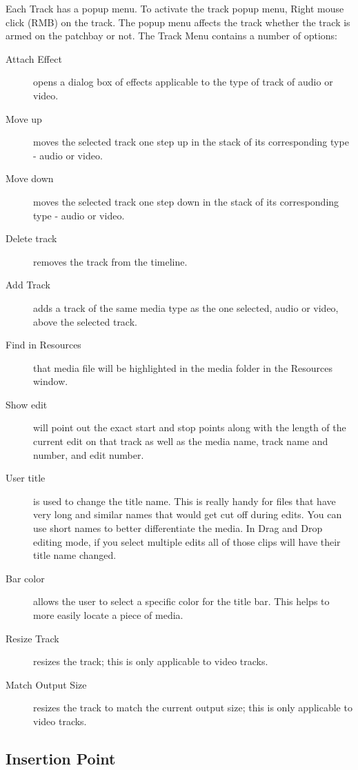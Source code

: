 Each Track has a popup menu. 
To activate the track popup menu, Right mouse click (RMB) on the track. 
The popup menu affects the track whether the track is armed on the patchbay or not. 
The Track Menu contains a number of options:

\begin{description}
    \item[Attach Effect] opens a dialog box of effects applicable to the type of track of audio or video.
    \item[Move up] moves the selected track one step up in the stack of its corresponding type - audio or video.
    \item[Move down]  moves the selected track one step down in the stack of its corresponding type - audio or video.
    \item[Delete track]  removes the track from the timeline.
    \item[Add Track]  adds a track of the same media type as the one selected, audio or video, above the selected track.
    \item[Find in Resources]  that media file will be highlighted in the media folder in the Resources window.
    \item[Show edit]  will point out the exact start and stop points along with the length of the current edit on
        that track as well as the media name, track name and number, and edit number.
    \item[User title]  is used to change the title name.  This is really handy for files that have very long and
        similar names that would get cut off during edits.  You can use short names to better differentiate the
        media. In Drag and Drop editing mode, if you select multiple edits all of those clips will have
their title name changed.
    \item[Bar color]  allows the user to select a specific color for the title bar.  This helps to more easily locate a piece of media.
    \item[Resize Track]  resizes the track; this is only applicable to video tracks.
    \item[Match Output Size]  resizes the track to match the current output size; this is only applicable to video tracks.
\end{description}


\subsection{Insertion Point}%
\label{sub:insertion_point}

